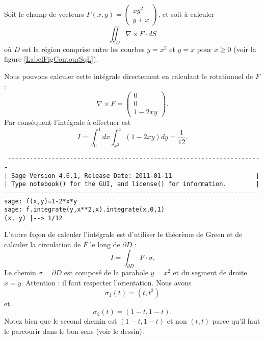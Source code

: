 \begin{example}     \label{ExempleGreenSqLOM}
    Soit le champ de vecteurs $F(x,y)=\begin{pmatrix}
        xy^2    \\ 
        y+x    
    \end{pmatrix}$, et soit à calculer
    \begin{equation}
        \iint_D\nabla\times F\cdot dS
    \end{equation}
    où $D$ est la région comprise entre les courbes $y=x^2$ et $y=x$ pour $x\geq 0$ (voir la figure \ref{LabelFigContourSqL}).
    \newcommand{\CaptionFigContourSqL}{Le contour d'intégration pour l'exemple \ref{ExempleGreenSqLOM}.}
    

    Nous pouvons calculer cette intégrale directement en calculant le rotationnel de $F$:
    \begin{equation}
        \nabla\times F=\begin{pmatrix}
            0    \\ 
            0    \\ 
            1-2xy    
        \end{pmatrix}.
    \end{equation}
    Par conséquent l'intégrale à effectuer est
    \begin{equation}
        I=\int_0^1 dx\int_{x^2}^x(1-2xy)dy=\frac{1}{ 12 }.
    \end{equation}
    \begin{verbatim}
 ----------------------------------------------------------------------
| Sage Version 4.6.1, Release Date: 2011-01-11                       |
| Type notebook() for the GUI, and license() for information.        |
----------------------------------------------------------------------
sage: f(x,y)=1-2*x*y
sage: f.integrate(y,x**2,x).integrate(x,0,1)
(x, y) |--> 1/12
    \end{verbatim}
    
    L'autre façon de calculer l'intégrale est d'utiliser le théorème de Green et de calculer la circulation de $F$ le long de $\partial D$ :
    \begin{equation}
        I=\int_{\partial D}F\cdot \sigma.
    \end{equation}
    Le chemin $\sigma=\partial D$ est composé de la parabole $y=x^2$ et du segment de droite $x=y$. Attention : il faut respecter l'orientation. Nous avons
    \begin{equation}
        \sigma_1(t)=(t,t^2)
    \end{equation}
    et
    \begin{equation}
        \sigma_2(t)=(1-t,1-t).
    \end{equation}
    Notez bien que le second chemin est $(1-t,1-t)$ et non $(t,t)$ parce qu'il faut le parcourir dans le bon sens (voir le dessin).


\end{example}
